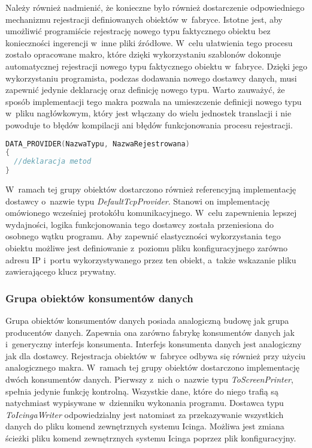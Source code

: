 
Należy również nadmienić, że konieczne było również dostarczenie
odpowiedniego mechanizmu rejestracji definiowanych obiektów
w~fabryce. Istotne jest, aby umożliwić programiście rejestrację nowego
typu faktycznego obiektu bez konieczności ingerencji w~inne pliki
źródłowe. W~celu ułatwienia tego procesu zostało opracowane makro,
które dzięki wykorzystaniu szablonów dokonuje automatycznej
rejestracji nowego typu faktycznego obiektu w~fabryce. Dzięki jego
wykorzystaniu programista, podczas dodawania nowego dostawcy danych,
musi zapewnić jedynie deklarację oraz definicję nowego typu. Warto
zauważyć, że sposób implementacji tego makra pozwala na umieszczenie
definicji nowego typu w~pliku nagłówkowym, który jest włączany do
wielu jednostek translacji i nie powoduje to błędów kompilacji ani
błędów funkcjonowania procesu rejestracji.

\vspace{0.5cm}
\begin{minipage}{\textwidth}
\begin{lstlisting}[language=c++, caption=Definicja dostawcy danych, linewidth=10cm]
DATA_PROVIDER(NazwaTypu, NazwaRejestrowana)
{
  //deklaracja metod
}
\end{lstlisting}
\end{minipage}
\vspace{0.5cm}

W~ramach tej grupy obiektów dostarczono również referencyjną
implementację dostawcy o~nazwie typu {\em DefaultTcpProvider}. Stanowi
on implementację omówionego wcześniej protokółu
komunikacyjnego. W~celu zapewnienia lepszej wydajności, logika
funkcjonowania tego dostawcy została przeniesiona do osobnego wątku
programu. Aby zapewnić elastyczności wykorzystania tego obiektu
możliwe jest definiowanie z~poziomu pliku konfiguracyjnego zarówno
adresu IP i~portu wykorzystywanego przez ten obiekt, a~także wskazanie
pliku zawierającego klucz prywatny.

\subsubsection[Grupa obiektów konsumentów danych][Grupa obiektów
konsumentów danych]{Grupa obiektów konsumentów danych}

Grupa obiektów konsumentów danych posiada analogiczną budowę jak grupa
producentów danych. Zapewnia ona zarówno fabrykę konsumentów danych
jak i~generyczny interfejs konsumenta. Interfejs konsumenta danych
jest analogiczny jak dla dostawcy. Rejestracja obiektów w~fabryce
odbywa się również przy użyciu analogicznego makra. W~ramach tej grupy
obiektów dostarczono implementację dwóch konsumentów danych. Pierwszy
z~nich o~nazwie typu {\em ToScreenPrinter}, spełnia jedynie funkcję
kontrolną. Wszystkie dane, które do niego trafią są natychmiast
wypisywane w~dzienniku wykonania programu. Dostawca typu {\em
  ToIcingaWriter} odpowiedzialny jest natomiast za przekazywanie
wszystkich danych do pliku komend zewnętrznych systemu Icinga. Możliwa
jest zmiana ścieżki pliku komend zewnętrznych systemu Icinga poprzez
plik konfiguracyjny.

